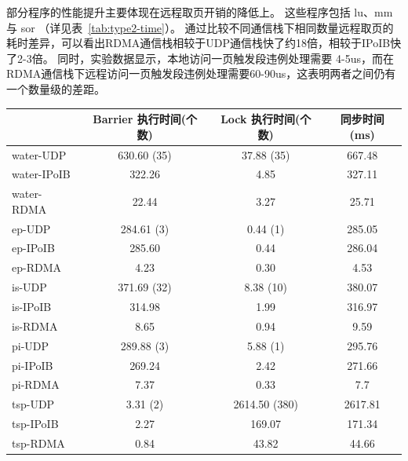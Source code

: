 {    部分程序的性能提升主要体现在远程取页开销的降低上。
    这些程序包括 lu、mm 与 sor （详见表~\ref{tab:type2-time}）。
    通过比较不同通信栈下相同数量远程取页的耗时差异，可以看出RDMA通信栈相较于UDP通信栈快了约18倍，相较于IPoIB快了2-3倍。
    同时，实验数据显示，本地访问一页触发段违例处理需要 4-5us，而在RDMA通信栈下远程访问一页触发段违例处理需要60-90us，这表明两者之间仍有一个数量级的差距。

    \begin{table}
        \footnotesize%
        \setlength{\tabcolsep}{4pt}%
        \renewcommand{\arraystretch}{1.5}%
        \centering
        \label{tab:type1-time}
        \begin{tabular}{l|c|c|c}
            \hline
                        & Barrier 执行时间(个数) & Lock 执行时间(个数) & 同步时间(ms) \\
            \hline
            water-UDP   & 630.60 (35)      & 37.88 (35)    & 667.48   \\
            water-IPoIB & 322.26           & 4.85          & 327.11   \\
            water-RDMA  & 22.44            & 3.27          & 25.71    \\
            \hline
            ep-UDP      & 284.61 (3)       & 0.44 (1)      & 285.05   \\
            ep-IPoIB    & 285.60           & 0.44          & 286.04   \\
            ep-RDMA     & 4.23             & 0.30          & 4.53     \\
            \hline
            is-UDP      & 371.69 (32)      & 8.38 (10)     & 380.07   \\
            is-IPoIB    & 314.98           & 1.99          & 316.97   \\
            is-RDMA     & 8.65             & 0.94          & 9.59     \\
            \hline
            pi-UDP      & 289.88 (3)       & 5.88 (1)      & 295.76   \\
            pi-IPoIB    & 269.24           & 2.42          & 271.66   \\
            pi-RDMA     & 7.37             & 0.33          & 7.7      \\
            \hline
            tsp-UDP     & 3.31 (2)         & 2614.50 (380) & 2617.81  \\
            tsp-IPoIB   & 2.27             & 169.07        & 171.34   \\
            tsp-RDMA    & 0.84             & 43.82         & 44.66    \\
            \hline
        \end{tabular}
    \end{table}

}

